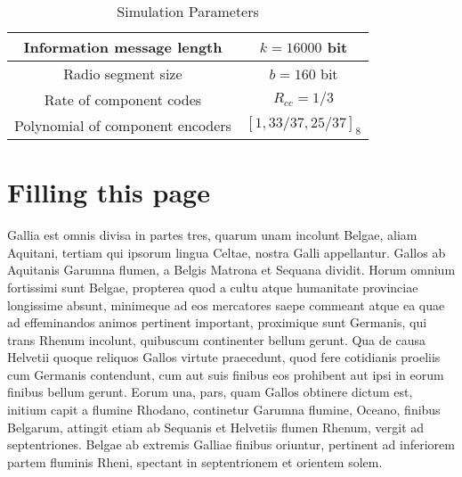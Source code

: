 \documentclass[journal, a4paper]{IEEEtran}
\begin{document}
	\begin{table}[!hbt]
		\begin{center}
		\caption{Simulation Parameters}
		\label{tab:simParameters}
		\begin{tabular}{|c|c|}
			\hline
			Information message length & $k=16000$ bit \\
			\hline
			Radio segment size & $b=160$ bit \\
			\hline
			Rate of component codes & $R_{cc}=1/3$\\
			\hline
			Polynomial of component encoders & $[1 , 33/37 , 25/37]_8$\\
			\hline
		\end{tabular}
		\end{center}
	\end{table}



\section{Filling this page}
	Gallia est omnis divisa in partes tres, quarum unam incolunt Belgae, aliam Aquitani, tertiam qui ipsorum lingua Celtae, nostra Galli appellantur. Gallos ab Aquitanis Garumna flumen, a Belgis Matrona et Sequana dividit. Horum omnium fortissimi sunt Belgae, propterea quod a cultu atque humanitate provinciae longissime absunt, minimeque ad eos mercatores saepe commeant atque ea quae ad effeminandos animos pertinent important, proximique sunt Germanis, qui trans Rhenum incolunt, quibuscum continenter bellum gerunt. Qua de causa Helvetii quoque reliquos Gallos virtute praecedunt, quod fere cotidianis proeliis cum Germanis contendunt, cum aut suis finibus eos prohibent aut ipsi in eorum finibus bellum gerunt. Eorum una, pars, quam Gallos obtinere dictum est, initium capit a flumine Rhodano, continetur Garumna flumine, Oceano, finibus Belgarum, attingit etiam ab Sequanis et Helvetiis flumen Rhenum, vergit ad septentriones. Belgae ab extremis Galliae finibus oriuntur, pertinent ad inferiorem partem fluminis Rheni, spectant in septentrionem et orientem solem.
\end{document}
